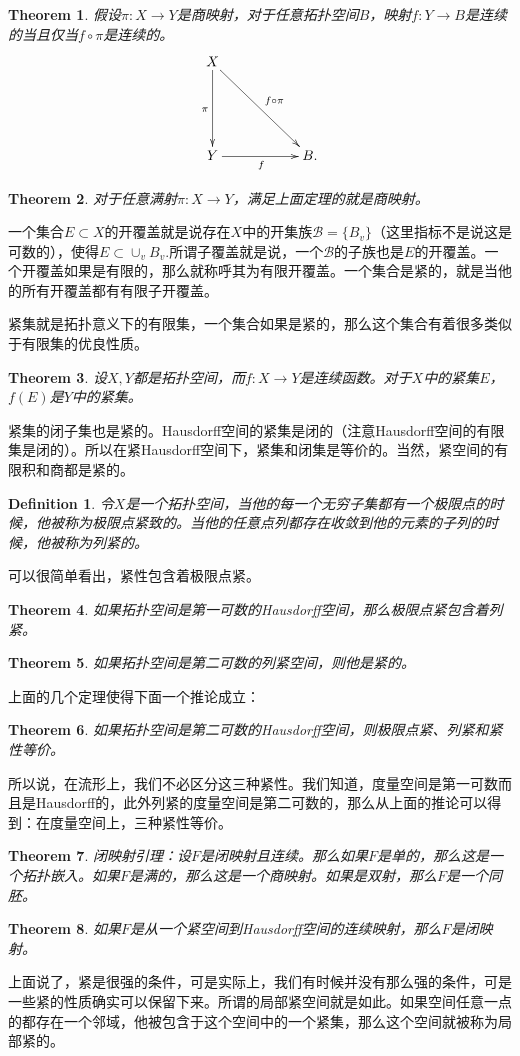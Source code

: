 \documentclass[10pt]{book}
\theoremstyle{plain}%
\newtheorem{theo}{Theorem}%
\newtheorem{defi}{Definition}%
\begin{document}
\begin{theo}
假设$\pi:X\to Y$是商映射，对于任意拓扑空间$B$，映射$f:Y \to B$是连续的当且仅当$f \circ \pi$是连续的。
\[
   \xymatrix{
   X\ar[dd]_\pi \ar[ddrr]^{f\circ\pi}&&\\
   &&\\
   Y\ar[rr]_f&&B.
    }
\]
\end{theo}
\begin{theo}
对于任意满射$\pi:X\to Y$，满足上面定理的就是商映射。
\end{theo}
一个集合$E\subset X$的开覆盖就是说存在$X$中的开集族$\mathcal{B}=\{B_v\}$（这里指标不是说这是可数的），使得$E \subset \cup_v B_v$.所谓子覆盖就是说，一个$\mathcal{B}$的子族也是$E$的开覆盖。一个开覆盖如果是有限的，那么就称呼其为有限开覆盖。一个集合是紧的，就是当他的所有开覆盖都有有限子开覆盖。

紧集就是拓扑意义下的有限集，一个集合如果是紧的，那么这个集合有着很多类似于有限集的优良性质。
\begin{theo}
设$X,Y$都是拓扑空间，而$f:X\to Y$是连续函数。对于$X$中的紧集$E$，$f(E)$是$Y$中的紧集。
\end{theo}
紧集的闭子集也是紧的。Hausdorff空间的紧集是闭的（注意Hausdorff空间的有限集是闭的）。所以在紧Hausdorff空间下，紧集和闭集是等价的。当然，紧空间的有限积和商都是紧的。
\begin{defi}
令$X$是一个拓扑空间，当他的每一个无穷子集都有一个极限点的时候，他被称为极限点紧致的。当他的任意点列都存在收敛到他的元素的子列的时候，他被称为列紧的。
\end{defi}
可以很简单看出，紧性包含着极限点紧。
\begin{theo}
如果拓扑空间是第一可数的Hausdorff空间，那么极限点紧包含着列紧。
\end{theo}
\begin{theo}
如果拓扑空间是第二可数的列紧空间，则他是紧的。
\end{theo}
上面的几个定理使得下面一个推论成立：
\begin{theo}
如果拓扑空间是第二可数的Hausdorff空间，则极限点紧、列紧和紧性等价。
\end{theo}
所以说，在流形上，我们不必区分这三种紧性。我们知道，度量空间是第一可数而且是Hausdorff的，此外列紧的度量空间是第二可数的，那么从上面的推论可以得到：在度量空间上，三种紧性等价。
\begin{theo}
闭映射引理：设$F$是闭映射且连续。那么如果$F$是单的，那么这是一个拓扑嵌入。如果$F$是满的，那么这是一个商映射。如果是双射，那么$F$是一个同胚。
\end{theo}
\begin{theo}
如果$F$是从一个紧空间到Hausdorff空间的连续映射，那么$F$是闭映射。
\end{theo}
上面说了，紧是很强的条件，可是实际上，我们有时候并没有那么强的条件，可是一些紧的性质确实可以保留下来。所谓的局部紧空间就是如此。如果空间任意一点的都存在一个邻域，他被包含于这个空间中的一个紧集，那么这个空间就被称为局部紧的。
\end{document}

